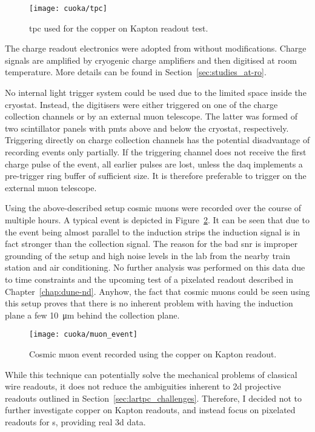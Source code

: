 \begin{figure}[htb]
	\centering
	\texttt{[image: cuoka/tpc]}
	\caption[Copper on Kapton test ]{%
		\acrshort{tpc} used for the copper on Kapton readout test.
	}
	\label{fig:cuoka_tpc}
\end{figure}

The charge readout electronics were adopted from \AT{} without modifications.
Charge signals are amplified by cryogenic charge amplifiers and then digitised at room temperature.
More details can be found in Section~\ref{sec:studies_at-ro}.

No internal light trigger system could be used due to the limited space inside the cryostat.
Instead, the digitisers were either triggered on one of the charge collection channels or by an external muon telescope.
The latter was formed of two scintillator panels with \glspl{pmt} above and below the cryostat, respectively.
Triggering directly on charge collection channels has the potential disadvantage of recording events only partially.
If the triggering channel does not receive the first charge pulse of the event, all earlier pulses are lost, unless the \gls{daq} implements a pre-trigger ring buffer of sufficient size.
It is therefore preferable to trigger on the external muon telescope.

Using the above-described setup cosmic muons were recorded over the course of multiple hours.
A typical event is depicted in Figure~\ref{fig:cuoka_event}.
It can be seen that due to the event being almost parallel to the induction strips the induction signal is in fact stronger than the collection signal.
The reason for the bad \gls{snr} is improper grounding of the setup and high noise levels in the lab from the nearby train station and air conditioning.
No further analysis was performed on this data due to time constraints and the upcoming test of a pixelated readout described in Chapter~\ref{chap:dune-nd}.
Anyhow, the fact that cosmic muons could be seen using this setup proves that there is no inherent problem with having the induction plane a few \SI{10}{\micro\metre} behind the collection plane.

\begin{figure}[htb]
	\centering
	\texttt{[image: cuoka/muon\_event]}
	\caption[Copper on Kapton test muon event]{%
		Cosmic muon event recorded using the copper on Kapton readout.
	}
	\label{fig:cuoka_event}
\end{figure}

While this technique can potentially solve the mechanical problems of classical wire readouts, it does not reduce the ambiguities inherent to \gls{2d} projective readouts outlined in Section~\ref{sec:lartpc_challenges}.
Therefore, I decided not to further investigate copper on Kapton readouts, and instead focus on pixelated readouts for \lartpc{}s, providing real \gls{3d} data.


